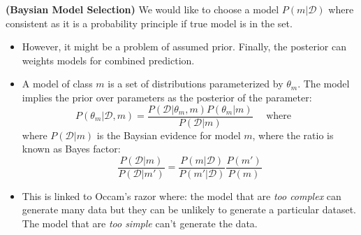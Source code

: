\begin{definition}{\textbf{(Baysian Model Selection)}}
    We would like to choose a model $P(m|\mathcal{D})$  where consistent as it is a probability principle if true model is in the set. 
    \begin{itemize}
        \item However, it might be a problem of assumed prior. Finally, the posterior can weights models for combined prediction. 
        \item A model of class $m$ is a set of distributions parameterized by $\theta_m$. The model implies the prior over parameters as the posterior of the parameter:
        \begin{equation*}
            P(\theta_m | \mathcal{D}, m) = \frac{P(\mathcal{D}|\theta_m,m)P(\theta_m|m)}{P(\mathcal{D}|m)} \quad \text{ where } \quad 
        \end{equation*}
        where $P(\mathcal{D}|m)$ is the Baysian evidence for model $m$, where the ratio is known as Bayes factor:
        \begin{equation*}
            \frac{P(\mathcal{D}|m)}{P(\mathcal{D}|m')} = \frac{P(m|\mathcal{D})}{P(m'|\mathcal{D})}\frac{P(m')}{P(m)}
        \end{equation*}
        \item This is linked to Occam's razor where: the model that are \emph{too complex} can generate many data but they can be unlikely to generate a particular dataset. The model that are \emph{too simple} can't generate the data. 
    \end{itemize}
\end{definition}

